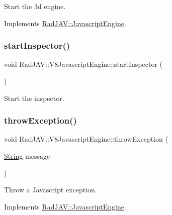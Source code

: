 Start the 3d engine. 



Implements \mbox{\hyperlink{class_rad_j_a_v_1_1_javascript_engine_a76c00d87d65f69781e2dc4aa3143acac}{Rad\+J\+A\+V\+::\+Javascript\+Engine}}.

\mbox{\label{class_rad_j_a_v_1_1_v8_javascript_engine_a85fca2239b08a4c600e5f1269dabf948}} 
\subsubsection{\texorpdfstring{start\+Inspector()}{startInspector()}}
{\footnotesize\ttfamily void Rad\+J\+A\+V\+::\+V8\+Javascript\+Engine\+::start\+Inspector (\begin{DoxyParamCaption}{ }\end{DoxyParamCaption})}



Start the inspector. 

\mbox{\label{class_rad_j_a_v_1_1_v8_javascript_engine_a08ad9464e2efe78b0c84d32728b12632}} 
\subsubsection{\texorpdfstring{throw\+Exception()}{throwException()}}
{\footnotesize\ttfamily void Rad\+J\+A\+V\+::\+V8\+Javascript\+Engine\+::throw\+Exception (\begin{DoxyParamCaption}\item[{\mbox{\hyperlink{class_rad_j_a_v_1_1_string}{String}}}]{message }\end{DoxyParamCaption})\hspace{0.3cm}{\ttfamily [virtual]}}



Throw a Javascript exception. 



Implements \mbox{\hyperlink{class_rad_j_a_v_1_1_javascript_engine_ab9f13c1928d6967122d0f9a6a026dc73}{Rad\+J\+A\+V\+::\+Javascript\+Engine}}.


